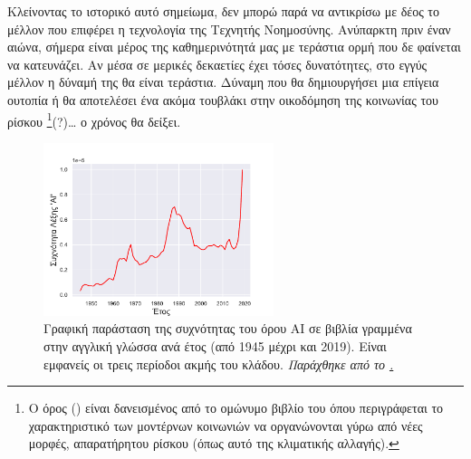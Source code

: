 Κλείνοντας το ιστορικό αυτό σημείωμα, δεν μπορώ παρά να αντικρίσω με δέος το μέλλον που επιφέρει η τεχνολογία της Τεχνητής Νοημοσύνης. Ανύπαρκτη πριν έναν αιώνα, σήμερα είναι μέρος της καθημερινότητά μας με τεράστια ορμή που δε φαίνεται να κατευνάζει. Αν μέσα σε μερικές δεκαετίες έχει τόσες δυνατότητες, στο εγγύς μέλλον η δύναμή της θα είναι τεράστια. Δύναμη που θα δημιουργήσει μια επίγεια ουτοπία ή θα αποτελέσει ένα ακόμα τουβλάκι στην οικοδόμηση της κοινωνίας του ρίσκου \footnote{Ο όρος  () είναι δανεισμένος από το ομώνυμο βιβλίο του  \cite{beck2014risk} όπου περιγράφεται το χαρακτηριστικό των μοντέρνων κοινωνιών να οργανώνονται γύρω από νέες μορφές, απαρατήρητου ρίσκου (όπως αυτό της κλιματικής αλλαγής).}(?)… ο χρόνος θα δείξει.


\begin{figure}[h]
    \centering
    \includegraphics[width=0.6\textwidth]{images/introduction/ngramAI_greek.pdf}
    \caption{Γραφική παράσταση της συχνότητας του όρου AI σε βιβλία γραμμένα στην αγγλική γλώσσα ανά έτος (από 1945 μέχρι και 2019). Είναι εμφανείς οι τρεις περίοδοι ακμής του κλάδου. \textit{Παράχθηκε από το \href{https://books.google.com/ngrams}{.}} }
\end{figure}


